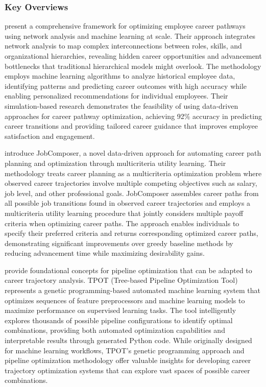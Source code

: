 \documentclass[main.tex]{subfiles}
\begin{document}
\subsubsection{Key Overviews}

\textcite{career_optimization} present a comprehensive framework for optimizing employee career pathways using network analysis and machine learning at scale. Their approach integrates network analysis to map complex interconnections between roles, skills, and organizational hierarchies, revealing hidden career opportunities and advancement bottlenecks that traditional hierarchical models might overlook. The methodology employs machine learning algorithms to analyze historical employee data, identifying patterns and predicting career outcomes with high accuracy while enabling personalized recommendations for individual employees. Their simulation-based research demonstrates the feasibility of using data-driven approaches for career pathway optimization, achieving 92\% accuracy in predicting career transitions and providing tailored career guidance that improves employee satisfaction and engagement.

\textcite{jobcomposer} introduce JobComposer, a novel data-driven approach for automating career path planning and optimization through multicriteria utility learning. Their methodology treats career planning as a multicriteria optimization problem where observed career trajectories involve multiple competing objectives such as salary, job level, and other professional goals. JobComposer assembles career paths from all possible job transitions found in observed career trajectories and employs a multicriteria utility learning procedure that jointly considers multiple payoff criteria when optimizing career paths. The approach enables individuals to specify their preferred criteria and returns corresponding optimized career paths, demonstrating significant improvements over greedy baseline methods by reducing advancement time while maximizing desirability gains.

\textcite{tpot} provide foundational concepts for pipeline optimization that can be adapted to career trajectory analysis. TPOT (Tree-based Pipeline Optimization Tool) represents a genetic programming-based automated machine learning system that optimizes sequences of feature preprocessors and machine learning models to maximize performance on supervised learning tasks. The tool intelligently explores thousands of possible pipeline configurations to identify optimal combinations, providing both automated optimization capabilities and interpretable results through generated Python code. While originally designed for machine learning workflows, TPOT's genetic programming approach and pipeline optimization methodology offer valuable insights for developing career trajectory optimization systems that can explore vast spaces of possible career combinations.
\end{document}
